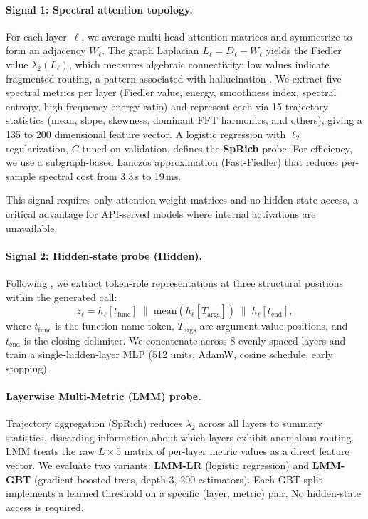 \documentclass{article}
\begin{document}
\paragraph{Signal 1: Spectral attention topology.}
For each layer~$\ell$, we average multi-head attention matrices and
symmetrize to form an adjacency $W_\ell$.  The graph Laplacian $L_\ell =
D_\ell - W_\ell$ yields the Fiedler value $\lambda_2(L_\ell)$, which
measures algebraic connectivity: low values indicate fragmented routing,
a pattern associated with hallucination \cite{noel2026geometry}.  We
extract five spectral metrics per layer (Fiedler value, energy,
smoothness index, spectral entropy, high-frequency energy ratio) and
represent each via 15 trajectory statistics (mean, slope, skewness,
dominant FFT harmonics, and others), giving a 135 to 200 dimensional
feature vector.  A logistic regression with $\ell_2$ regularization, $C$
tuned on validation, defines the \textbf{SpRich} probe.  For efficiency,
we use a subgraph-based Lanczos approximation (Fast-Fiedler) that
reduces per-sample spectral cost from 3.3\,s to 19\,ms.

This signal requires only attention weight matrices and no hidden-state
access, a critical advantage for API-served models where internal
activations are unavailable.

\paragraph{Signal 2: Hidden-state probe (Hidden).}
Following \cite{healy2026internal}, we extract token-role representations
at three structural positions within the generated call:
\begin{equation}
  z_\ell = h_\ell[t_\text{func}] \;\|\;
           \text{mean}(h_\ell[T_\text{args}]) \;\|\;
           h_\ell[t_\text{end}],
  \label{eq:tokenrole}
\end{equation}
where $t_\text{func}$ is the function-name token, $T_\text{args}$ are
argument-value positions, and $t_\text{end}$ is the closing delimiter.
We concatenate across 8 evenly spaced layers and train a
single-hidden-layer MLP (512 units, AdamW, cosine schedule, early
stopping).

\paragraph{Layerwise Multi-Metric (LMM) probe.}
Trajectory aggregation (SpRich) reduces $\lambda_2$ across all layers to
summary statistics, discarding information about which layers exhibit
anomalous routing.  LMM treats the raw $L \times 5$ matrix of per-layer
metric values as a direct feature vector.  We evaluate two variants:
\textbf{LMM-LR} (logistic regression) and \textbf{LMM-GBT}
(gradient-boosted trees, depth 3, 200 estimators).  Each GBT split
implements a learned threshold on a specific (layer, metric) pair.
No hidden-state access is required.
\end{document}
